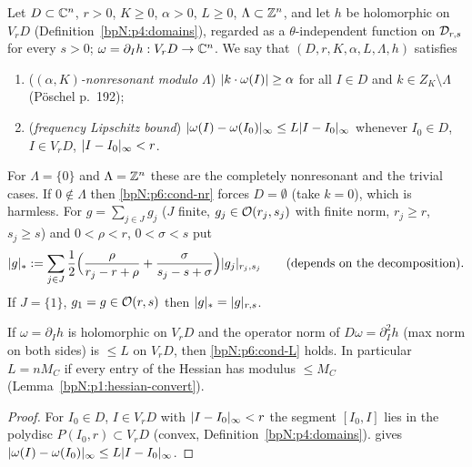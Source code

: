 \begin{definition}\label{bpN:p6:setting}
Let $D\subset\mathbb{C}^n$, $r>0$, $K\ge0$, $\alpha>0$, $L\ge0$, $\Lambda\subset\mathbb{Z}^n$, and let $h$ be holomorphic on $V_rD$ (Definition~\ref{bpN:p4:domains}), regarded as a $\theta$-independent function on $\mathcal D_{r,s}$ for every $s>0$; $\omega=\partial_Ih:V_rD\to\mathbb{C}^n$. We say that $(D,r,K,\alpha,L,\Lambda,h)$ satisfies
\begin{enumerate}[label=(\textup{N}\arabic*)]
\item\label{bpN:p6:cond-nr} (\emph{$(\alpha,K)$-nonresonant modulo $\Lambda$}) $\lvert k\cdot\omega(I)\rvert\ge\alpha$ for all $I\in D$ and $k\in Z_K\setminus\Lambda$ (P\"oschel p.~192);
\item\label{bpN:p6:cond-L} (\emph{frequency Lipschitz bound}) $\lvert \omega(I)-\omega(I_0)\rvert_\infty\le L\lvert I-I_0\rvert_\infty$ whenever $I_0\in D$, $I\in V_rD$, $\lvert I-I_0\rvert_\infty<r$.
\end{enumerate}
For $\Lambda=\{0\}$ and $\Lambda=\mathbb{Z}^n$ these are the completely nonresonant and the trivial cases. If $0\notin\Lambda$ then \ref{bpN:p6:cond-nr} forces $D=\emptyset$ (take $k=0$), which is harmless.
For $g=\sum_{j\in J}g_j$ ($J$ finite, $g_j\in\mathcal O(r_j,s_j)$ with finite norm, $r_j\ge r$, $s_j\ge s$) and $0<\rho<r$, $0<\sigma<s$ put
\[\lvert g\rvert_*:=\sum_{j\in J}\frac12\Bigl(\frac\rho{r_j-r+\rho}+\frac\sigma{s_j-s+\sigma}\Bigr)\lvert g_j\rvert_{r_j,s_j}\qquad(\text{depends on the decomposition}).\]
If $J=\{1\}$, $g_1=g\in\mathcal O(r,s)$ then $\lvert g\rvert_*=\lvert g\rvert_{r,s}$.
\end{definition}

\begin{lemma}\label{bpN:p6:lipschitz}
If $\omega=\partial_Ih$ is holomorphic on $V_rD$ and the operator norm of $D\omega=\partial_I^2h$ (max norm on both sides) is $\le L$ on $V_rD$, then \ref{bpN:p6:cond-L} holds. In particular $L=nM_C$ if every entry of the Hessian has modulus $\le M_C$ (Lemma~\ref{bpN:p1:hessian-convert}).
\end{lemma}
\begin{proof}
\label{stepN:p6:lip-seg} For $I_0\in D$, $I\in V_rD$ with $\lvert I-I_0\rvert_\infty<r$ the segment $[I_0,I]$ lies in the polydisc $P(I_0,r)\subset V_rD$ (convex, Definition~\ref{bpN:p4:domains}).  gives $\lvert \omega(I)-\omega(I_0)\rvert_\infty\le L\lvert I-I_0\rvert_\infty$.
\end{proof}

